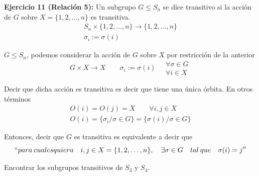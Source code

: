 \documentclass{article}
\begin{document}
\textbf{Ejercicio 11 (Relación 5):} Un subgrupo $G\leq S_n$ se dice transitivo si la acción de $G$ sobre $X=\{1,2,\ldots,n\}$ es transitiva.
\begin{gather*}
S_n\times \{1,2,\ldots,n\}\longrightarrow \{1,2,\ldots,n\} \\
\sigma_i:=\sigma(i)
\end{gather*}

$G\leq S_n$, podemos considerar la acción de $G$ sobre $X$ por restricción de la anterior
\begin{equation*}
G\times X\longrightarrow X\qquad \sigma_i:=\sigma(i)\quad \left.\begin{array}{c}
\forall \sigma \in G\\
\forall i\in X
\end{array} \right.
\end{equation*}

Decir que dicha acción es transitiva es decir que tiene una única órbita. En otros términos
\begin{gather*}
O(i)=O(j)=X\qquad \forall i,j\in X \\
O(i)=\{\sigma_i/\sigma \in G\}=\{\sigma(i)/\sigma\in G\}
\end{gather*}

Entonces, decir que $G$ es transitiva es equivalente a decir que
\begin{equation*}
``para\:cualesquiera\quad i,j\in X=\{1,2,\ldots,n\},\quad \exists\sigma \in G\quad tal\:que\quad \sigma(i)=j''
\end{equation*}

Encontrar los subgrupos transitivos de $S_3$ y $S_4$.
\end{document}
